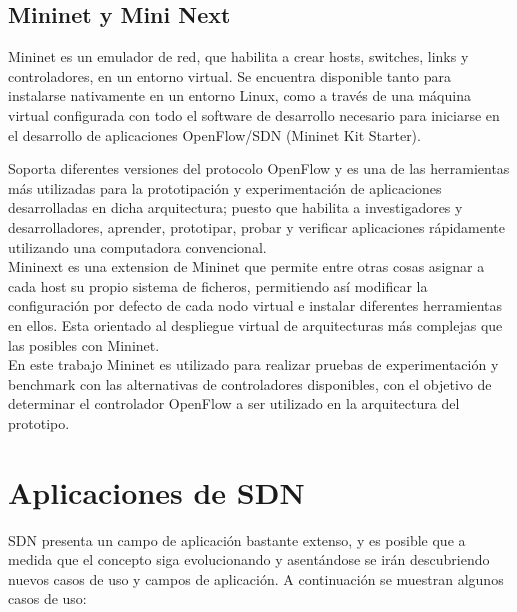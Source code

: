 \subsection{Mininet y Mini Next}
Mininet\cite{Mininet1} es un emulador de red, que habilita a crear hosts, switches, links y controladores, en un entorno virtual. Se encuentra disponible tanto para instalarse nativamente en un entorno Linux, como a través de una m\'aquina virtual configurada con todo el software de desarrollo necesario para iniciarse en el desarrollo de aplicaciones OpenFlow/SDN (Mininet Kit Starter). 

Soporta diferentes versiones del protocolo OpenFlow y es una de las herramientas m\'as utilizadas para la prototipaci\'on y experimentación de aplicaciones desarrolladas en dicha arquitectura; puesto que habilita a investigadores y desarrolladores, aprender, prototipar, probar y verificar aplicaciones rápidamente utilizando una computadora convencional.\\

Mininext es una extension de Mininet que permite entre otras cosas asignar a cada host su propio sistema de ficheros, permitiendo as\'i modificar la configuraci\'on por defecto de cada nodo virtual e instalar diferentes herramientas en ellos. Esta orientado al despliegue virtual de arquitecturas m\'as complejas que las posibles con Mininet.\\   

En este trabajo Mininet es utilizado para realizar pruebas de experimentaci\'on y benchmark con las alternativas de controladores disponibles, con el objetivo de determinar el controlador OpenFlow a ser utilizado en la arquitectura del prototipo.\\

\section{Aplicaciones de SDN}
SDN presenta un campo de aplicación bastante extenso, y es posible que a medida que el concepto siga evolucionando y asentándose se irán descubriendo nuevos casos de uso y campos de aplicación. A continuación se muestran algunos casos de uso:

